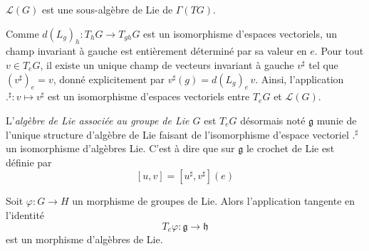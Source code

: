 \begin{proposition}
  $\mathcal{L}(G)$ est une sous-algèbre de Lie de $\Gamma(TG)$.
\end{proposition}

Comme $d(L_g)_h : T_h G \to T_{gh} G$ est un isomorphisme d'espaces vectoriels, un champ invariant à gauche est entièrement déterminé par sa valeur en $e$. Pour tout $v \in T_e G$, il existe un unique champ de vecteurs invariant à gauche $v^\sharp$ tel que $(v^\sharp)_e = v$, donné explicitement par $v^\sharp(g) = d(L_g)_e\, v$. Ainsi, l'application $.^\sharp : v \mapsto v^\sharp$ est un isomorphisme d'espaces vectoriels entre $T_e G$ et $\mathcal{L}(G)$.


\begin{definition}
    L'\emph{algèbre de Lie associée au groupe de Lie $G$} est $T_e G$ désormais noté $\mathfrak{g}$ munie de l'unique structure d'algèbre de Lie faisant de l'isomorphisme d'espace vectoriel $.^\sharp$ un isomorphisme d'algèbres Lie. C'est à dire que sur $\mathfrak{g}$ le crochet de Lie est définie par 
    $$[u, v] = [u^\sharp, v^\sharp](e)$$
\end{definition}

\begin{proposition}
  Soit $\varphi : G \to H$ un morphisme de groupes de Lie. Alors l'application tangente en l'identité
  $$T_e\varphi : \mathfrak{g} \longrightarrow \mathfrak{h}$$
  est un morphisme d'algèbres de Lie.
\end{proposition}